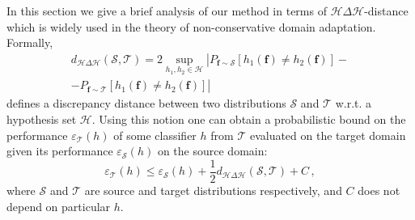 In this section we give a brief analysis of our method in terms of $ \mathcal{H} \Delta \mathcal{H} $-distance \cite{Ben10,Cortes11} which is widely used in the theory of non-conservative domain adaptation. Formally,
\begin{multline}
  d_{\mathcal{H} \Delta \mathcal{H}} (\mathcal{S}, \mathcal{T}) = 2 \sup_{h_1, h_2 \in \mathcal{H}} \left| P_{\mathbf{f} \sim \mathcal{S}} [h_1(\mathbf{f}) \neq h_2(\mathbf{f})] - \right. \\
  \left. - P_{\mathbf{f} \sim \mathcal{T}} [h_1(\mathbf{f}) \neq h_2(\mathbf{f})] \right|
\label{eq:hdh_dist}
\end{multline}
defines a discrepancy distance between two distributions $ \mathcal{S} $ and $ \mathcal{T} $ w.r.t. a hypothesis set $ \mathcal{H} $. Using this notion one can obtain a probabilistic bound \cite{Ben10} on the performance $ \varepsilon_\mathcal{T}(h) $ of some classifier $ h $ from $ \mathcal{T} $ evaluated on the target domain given its performance $ \varepsilon_\mathcal{S}(h) $ on the source domain:
\begin{equation}
  \varepsilon_\mathcal{T}(h) \leq \varepsilon_\mathcal{S}(h) + \frac{1}{2} d_{\mathcal{H} \Delta \mathcal{H}} (\mathcal{S}, \mathcal{T}) + C \, ,
\end{equation}
where $ \mathcal{S} $ and $ \mathcal{T} $ are source and target distributions respectively, and $ C $ does not depend on particular $ h $. 

